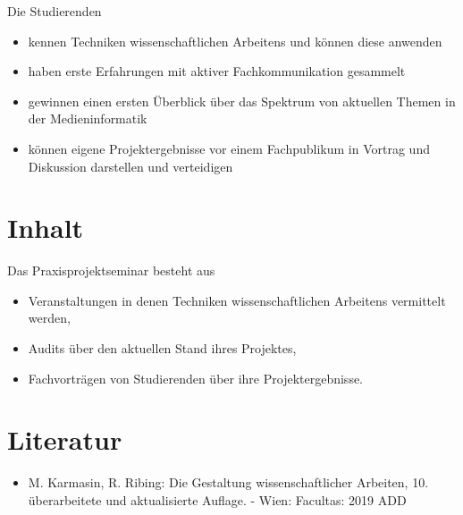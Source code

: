 Die Studierenden

\begin{itemize}
\tightlist
\item
  kennen Techniken wissenschaftlichen Arbeitens und können diese
  anwenden
\item
  haben erste Erfahrungen mit aktiver Fachkommunikation gesammelt
\item
  gewinnen einen ersten Überblick über das Spektrum von aktuellen Themen
  in der Medieninformatik
\item
  können eigene Projektergebnisse vor einem Fachpublikum in Vortrag und
  Diskussion darstellen und verteidigen
\end{itemize}

\hypertarget{inhaltpathlabelmi-2017modulbeschreibungen-bachelorba_praxisprojektseminar}{%
\section*{Inhalt\label{/mi-2017/modulbeschreibungen-bachelor/BA_Praxisprojektseminar}}\label{inhaltpathlabelmi-2017modulbeschreibungen-bachelorba_praxisprojektseminar}}

Das Praxisprojektseminar besteht aus

\begin{itemize}
\tightlist
\item
  Veranstaltungen in denen Techniken wissenschaftlichen Arbeitens
  vermittelt werden,
\item
  Audits über den aktuellen Stand ihres Projektes,
\item
  Fachvorträgen von Studierenden über ihre Projektergebnisse.
\end{itemize}

\hypertarget{literaturpathlabelmi-2017modulbeschreibungen-bachelorba_praxisprojektseminar}{%
\section*{Literatur\label{/mi-2017/modulbeschreibungen-bachelor/BA_Praxisprojektseminar}}\label{literaturpathlabelmi-2017modulbeschreibungen-bachelorba_praxisprojektseminar}}

\begin{itemize}
\tightlist
\item
  M. Karmasin, R. Ribing: Die Gestaltung wissenschaftlicher Arbeiten,
  10. überarbeitete und aktualisierte Auflage. - Wien: Facultas: 2019
  ADD
\end{itemize}

